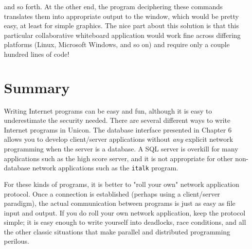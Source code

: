 
\noindent
and so forth. At the other end, the program deciphering these commands
translates them into appropriate output to the window, which would be
pretty easy, at least for simple graphics. The nice part about this
solution is that this particular collaborative whiteboard application
would work fine across differing platforms (Linux, Microsoft Windows,
and so on) and require only a couple hundred lines of code!

\section{Summary}

Writing Internet programs can be easy and fun, although it is easy to
underestimate the security needed. There are several
different ways to write Internet programs in Unicon. The
database interface presented in Chapter 6 allows you to
develop client/server applications without \textit{any} explicit
network programming when the server is a database. A SQL
server is overkill for many applications such as the high score server,
and it is not appropriate for other non-database network applications
such as the \texttt{italk} program.

For these kinds of programs, it is better to "roll your
own" network application protocol. Once a connection is
established (perhaps using a client/server paradigm), the actual
communication between programs is just as easy as file input and
output. If you do roll your own network application, keep the protocol
simple; it is easy enough to write yourself into deadlocks, race
conditions, and all the other classic situations that make parallel and
distributed programming perilous.

